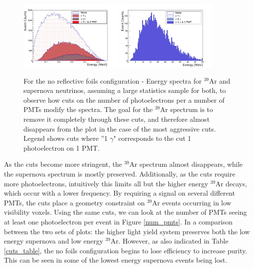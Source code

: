 \documentclass[a4paper]{article}
\begin{document}
\begin{figure}[H]
\center
\includegraphics[width=0.45\textwidth]{ar39_energy_spectrum_60pmts_vuv_labels.pdf}
\includegraphics[width=0.45\textwidth]{sn_energy_spectrum_60pmts_vuv_labels.pdf}
\caption{For the no reflective foils configuration - Energy spectra for $^{39}$Ar and supernova neutrinos, assuming a large statistics sample for both, to observe how cuts on the number of photoelectrons per a number of PMTs modify the spectra. The goal for the $^{39}$Ar spectrum is to remove it completely through these cuts, and therefore almost disappears from the plot in the case of the most aggressive cuts. Legend shows cuts where ''1 $\gamma$" corresponds to the cut 1 photoelectron on 1 PMT.}\label{scint_energy_cuts_vuv}
\end{figure}

As the cuts become more stringent, the $^{39}$Ar spectrum almost disappears, while the supernova spectrum is mostly preserved. Additionally, as the cuts require more photoelectrons, intuitively this limits all but the higher energy $^{39}$Ar decays, which occur with a lower frequency. By requiring a signal on several different PMTs, the cuts place a geometry constraint on $^{39}$Ar events occurring in low visibility voxels. Using the same cuts, we can look at the number of PMTs seeing at least one photoelectron per event in Figure \ref{num_pmts}. In a comparison between the two sets of plots: the higher light yield system preserves both the low energy supernova and low energy $^{39}$Ar. However, as also indicated in Table \ref{cuts_table}, the no foils configuration begins to lose efficiency to increase purity. This can be seen in some of the lowest energy supernova events being lost.
\end{document}
